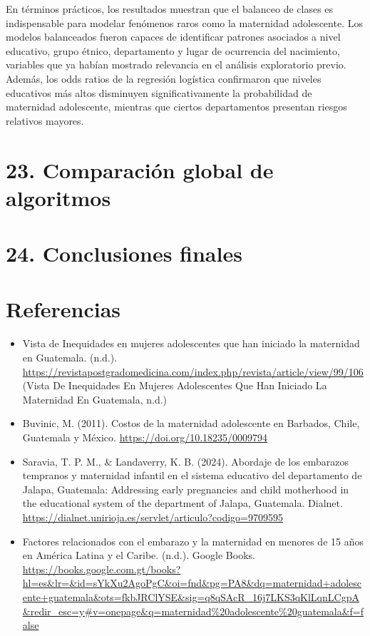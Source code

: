 \documentclass[
]{article}
\begin{document}
En términos prácticos, los resultados muestran que el balanceo de clases
es indispensable para modelar fenómenos raros como la maternidad
adolescente. Los modelos balanceados fueron capaces de identificar
patrones asociados a nivel educativo, grupo étnico, departamento y lugar
de ocurrencia del nacimiento, variables que ya habían mostrado
relevancia en el análisis exploratorio previo. Además, los odds ratios
de la regresión logística confirmaron que niveles educativos más altos
disminuyen significativamente la probabilidad de maternidad adolescente,
mientras que ciertos departamentos presentan riesgos relativos mayores.

\section{23. Comparación global de
algoritmos}\label{comparaciuxf3n-global-de-algoritmos}

\section{24. Conclusiones finales}\label{conclusiones-finales}

\section{Referencias}\label{referencias}

\begin{itemize}
\item
  Vista de Inequidades en mujeres adolescentes que han iniciado la
  maternidad en Guatemala. (n.d.).
  \url{https://revistapostgradomedicina.com/index.php/revista/article/view/99/106}
  (Vista De Inequidades En Mujeres Adolescentes Que Han Iniciado La
  Maternidad En Guatemala, n.d.)
\item
  Buvinic, M. (2011). Costos de la maternidad adolescente en Barbados,
  Chile, Guatemala y México. \url{https://doi.org/10.18235/0009794}
\item
  Saravia, T. P. M., \& Landaverry, K. B. (2024). Abordaje de los
  embarazos tempranos y maternidad infantil en el sistema educativo del
  departamento de Jalapa, Guatemala: Addressing early pregnancies and
  child motherhood in the educational system of the department of
  Jalapa, Guatemala. Dialnet.
  \url{https://dialnet.unirioja.es/servlet/articulo?codigo=9709595}
\item
  Factores relacionados con el embarazo y la maternidad en menores de 15
  años en América Latina y el Caribe. (n.d.). Google Books.
  \url{https://books.google.com.gt/books?hl=es&lr=&id=sYkXu2AgoPgC&oi=fnd&pg=PA8&dq=maternidad+adolescente+guatemala&ots=fkbJRClYSE&sig=q8qSAcR_16j7LKS3qKlLqnLCgpA&redir_esc=y\#v=onepage&q=maternidad\%20adolescente\%20guatemala&f=false}
\end{itemize}
\end{document}
